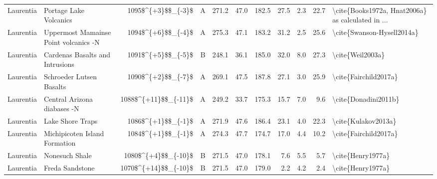 \begin{longtable}{p{1 in}p{1 in}rrrrrrrr}
                     Laurentia &                           Portage Lake Volcanics &     1095\$\textasciicircum \{+3\}\$\$\_\{-3\}\$ &      A &     271.2 &      47.0 & 182.5 &  27.5 &       2.3 &        22.7 &  \textbackslash cite\{Books1972a, Hnat2006a\} as calculated in ... \\
                     Laurentia &            Uppermost Mamainse Point volcanics -N &     1094\$\textasciicircum \{+6\}\$\$\_\{-4\}\$ &      A &     275.3 &      47.1 & 183.2 &  31.2 &       2.5 &        25.6 &                         \textbackslash cite\{Swanson-Hysell2014a\} \\
                     Laurentia &                  Cardenas Basalts and Intrusions &     1091\$\textasciicircum \{+5\}\$\$\_\{-5\}\$ &      B &     248.1 &      36.1 & 185.0 &  32.0 &       8.0 &        27.3 &                                   \textbackslash cite\{Weil2003a\} \\
                     Laurentia &                         Schroeder Lutsen Basalts &     1090\$\textasciicircum \{+2\}\$\$\_\{-7\}\$ &      A &     269.1 &      47.5 & 187.8 &  27.1 &       3.0 &        25.9 &                              \textbackslash cite\{Fairchild2017a\} \\
                     Laurentia &                      Central Arizona diabases -N &   1088\$\textasciicircum \{+11\}\$\$\_\{-11\}\$ &      A &     249.2 &      33.7 & 175.3 &  15.7 &       7.0 &         9.6 &                               \textbackslash cite\{Donadini2011b\} \\
                     Laurentia &                                 Lake Shore Traps &     1086\$\textasciicircum \{+1\}\$\$\_\{-1\}\$ &      A &     271.9 &      47.6 & 186.4 &  23.1 &       4.0 &        22.3 &                                \textbackslash cite\{Kulakov2013a\} \\
                     Laurentia &                    Michipicoten Island Formation &     1084\$\textasciicircum \{+1\}\$\$\_\{-1\}\$ &      A &     274.3 &      47.7 & 174.7 &  17.0 &       4.4 &        10.2 &                              \textbackslash cite\{Fairchild2017a\} \\
                     Laurentia &                                   Nonesuch Shale &    1080\$\textasciicircum \{+4\}\$\$\_\{-10\}\$ &      B &     271.5 &      47.0 & 178.1 &   7.6 &       5.5 &         5.7 &                                  \textbackslash cite\{Henry1977a\} \\
                     Laurentia &                                  Freda Sandstone &   1070\$\textasciicircum \{+14\}\$\$\_\{-10\}\$ &      B &     271.5 &      47.0 & 179.0 &   2.2 &       4.2 &         2.4 &                                  \textbackslash cite\{Henry1977a\} \\

\end{longtable}
